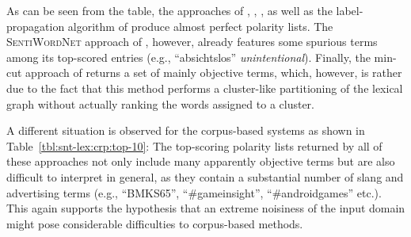As can be seen from the table, the approaches of \citet{Hu:04},
\citet{Blair-Goldensohn:08}, \citet{Kim:04}, as well as the
label-propagation algorithm of \citet{Rao:09} produce almost perfect
polarity lists.  The \textsc{SentiWordNet} approach of
\citet{Esuli:06c}, however, already features some spurious terms among
its top-scored entries (e.g., ``absichtslos'' \emph{unintentional}).
Finally, the min-cut approach of \citet{Rao:09} returns a set of
mainly objective terms, which, however, is rather due to the fact that
this method performs a cluster-like partitioning of the lexical graph
without actually ranking the words assigned to a cluster.

A different situation is observed for the corpus-based systems as
shown in Table~\ref{tbl:snt-lex:crp:top-10}: The top-scoring polarity
lists returned by all of these approaches not only include many
apparently objective terms but are also difficult to interpret in
general, as they contain a substantial number of slang and advertising
terms (e.g., ``BMKS65'', ``\#gameinsight'', ``\#androidgames'' etc.).
This again supports the hypothesis that an extreme noisiness of the
input domain might pose considerable difficulties to corpus-based
methods.

